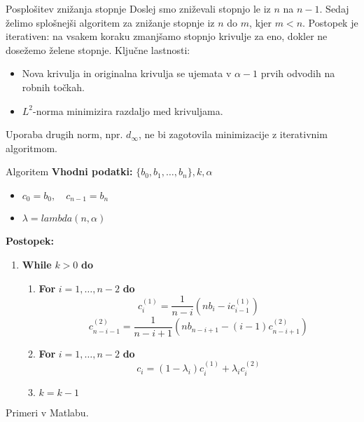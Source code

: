 \documentclass{beamer}
\begin{document}
\begin{frame}{Posplošitev znižanja stopnje}
    Doslej smo zniževali stopnjo le iz \(n\) na \(n-1\). Sedaj želimo splošnejši algoritem za znižanje stopnje iz \(n\) do \(m\), kjer \(m < n\).
    Postopek je iterativen: na vsakem koraku zmanjšamo stopnjo krivulje za eno, dokler ne dosežemo želene stopnje.
    Ključne lastnosti:
        \begin{itemize}
            \item Nova krivulja in originalna krivulja se ujemata v \(\alpha-1\) prvih odvodih na robnih točkah.
            \item \(L^2\)-norma minimizira razdaljo med krivuljama.
        \end{itemize}
    Uporaba drugih norm, npr. \(d_\infty\), ne bi zagotovila minimizacije z iterativnim algoritmom.
\end{frame}

\begin{frame}{Algoritem}
    \textbf{Vhodni podatki:} \(\{b_0, b_1, \ldots, b_n\}, k, \alpha \)
    \begin{itemize}
        \item \(c_0 = b_0, \quad c_{n-1} = b_n\)
        \item \(\lambda = lambda(n, \alpha)\)
    \end{itemize}

    \textbf{Postopek:}
    \begin{enumerate} %
        \item \textbf{While} \(k > 0\) \textbf{do}
        \begin{enumerate}
            \item \textbf{For} \(i = 1, \ldots, n - 2\) \textbf{do}
            \[
            c_i^{(1)} = \frac{1}{n-i}\left(n b_i - i c_{i-1}^{(1)}\right)
            \]
            \[
            c_{n-i-1}^{(2)} = \frac{1}{n-i+1}\left(n b_{n-i+1} - (i - 1) c_{n-i+1}^{(2)}\right)
            \]
            \item \textbf{For} \(i = 1, \ldots, n - 2\) \textbf{do}
            \[
            c_i = (1 - \lambda_i)c_i^{(1)} + \lambda_i c_i^{(2)}
            \]
            \item \(k = k - 1\)
        \end{enumerate}
    \end{enumerate}
\end{frame}




\begin{frame}
  Primeri v Matlabu.
\end{frame}
\end{document}

